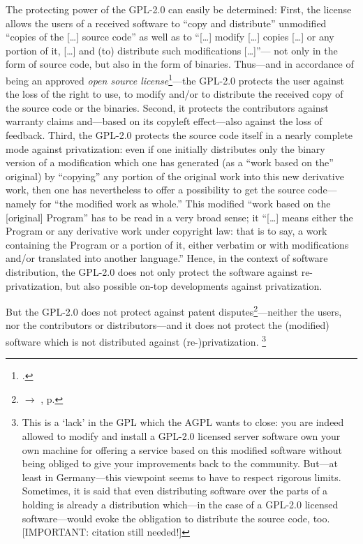 The protecting power of the GPL-2.0 can easily be determined: First, the license
allows the users of a received software to \enquote{copy and distribute}
unmodified \enquote{copies of the [\ldots] source code} as well
as to \enquote{[\ldots] modify [\ldots] copies [\ldots] or any portion of it,
[\ldots] and (to) distribute such modifications [\ldots]}---%
not only in the form of source code, but also in the form of
binaries. Thus---and in accordance of being an approved
\emph{open source license}\footcite[cf.][\nopage wp]{OSI2012b}---the GPL-2.0
protects the user against the loss of the right to use, to modify and/or to
distribute the received copy of the source code or the binaries. Second, it
protects the contributors against warranty claims
and---based on its copyleft effect---also against the
loss of feedback. Third, the GPL-2.0 protects the source code itself in a nearly
complete mode against privatization: even if one initially distributes only the
binary version of a modification which one has generated (as a \enquote{work
based on the} original) by \enquote{copying} any {portion} of the original work
into this new derivative work, then one has nevertheless to offer
a possibility to get the source code---namely for \enquote{the
modified work as whole.} This modified \enquote{work based on the
[original] Program} has to be read in a very broad sense; it \enquote{[\ldots]
means either the Program or any derivative work under copyright law: that is to
say, a work containing the Program or a portion of it, either verbatim or with
modifications and/or translated into another language.} Hence, in
the context of software distribution, the GPL-2.0 does not only protect the
software against re-privatization, but also possible on-top developments against
privatization. 

But the GPL-2.0 does not protect against patent disputes\footnote{$\rightarrow$
\oslic, p. }---neither the users, nor the
contributors or distributors---and it does not protect the (modified) software
which is not distributed against (re-)privatization.%
  \footnote{This is a `lack' in the GPL which the AGPL wants to close: you are
  indeed allowed to modify and install a GPL-2.0 licensed server software own
  your own machine for offering a service based on this modified software
  without being obliged to give your improvements back to the
  community. But---at least in Germany---this viewpoint seems to have to respect
  rigorous limits. Sometimes, it is said that even distributing software over
  the parts of a holding is already a distribution which---in the case of a
  GPL-2.0 licensed software---would evoke the obligation to distribute the
  source code, too. [IMPORTANT: citation still needed!]}

